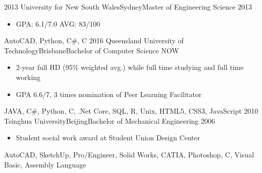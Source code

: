 %
%
%


\begin{experiences}

  \experience
    {2013}   {University for New South Wales}{Sydney}{Master of Engineering Science}
    {2013} {
                      \begin{itemize}
                        \item GPA: 6.1/7.0 AVG: 83/100
                      \end{itemize}
                    }
                    {AutoCAD, Python, C\#, C}
  \emptySeparator
  \experience
    {2016}   {Queensland University of Technology}{Brisbane}{Bachelor of Computer Science}
    {NOW} {
                      \begin{itemize}
                        \item 2-year full HD (95\% weighted avg.) while full time studying and full time working
                        \item GPA 6.6/7, 3 times nomination of Peer Learning Facilitator
                      \end{itemize}
                    }
                    {JAVA, C\#, Python, C, .Net Core, SQL, R, Unix, HTML5, CSS3, JavaScript}
  \emptySeparator
  \experience
    {2010}   {Tsinghua University}{Beijing}{Bachelor of Mechanical Engineering}
    {2006} {
                      \begin{itemize}
                        \item Student social work award at Student Union Design Center
                      \end{itemize}
                    }
                    {AutoCAD, SketchUp, Pro/Engineer, Solid Works, CATIA, Photoshop, C, Visual Basic, Assembly Language}
\end{experiences}